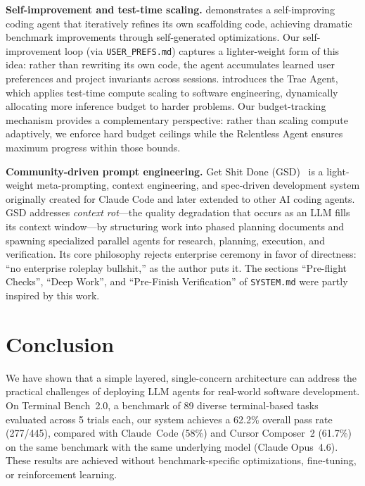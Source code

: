 \documentclass{article}
\begin{document}
\textbf{Self-improvement and test-time scaling.} \citet{robeyns2025selfimproving} demonstrates a self-improving coding agent that iteratively refines its own scaffolding code, achieving dramatic benchmark improvements through self-generated optimizations. Our self-improvement loop (via \texttt{USER\_PREFS.md}) captures a lighter-weight form of this idea: rather than rewriting its own code, the agent accumulates learned user preferences and project invariants across sessions.  \citet{gao2025trae} introduces the Trae Agent, which applies test-time compute scaling to software engineering, dynamically allocating more inference budget to harder problems.  Our budget-tracking mechanism provides a complementary perspective: rather than scaling compute adaptively, we enforce hard budget ceilings while the Relentless Agent ensures maximum progress within those bounds.

\textbf{Community-driven prompt engineering.} Get Shit Done (GSD)~\citep{gsd2025} is a light-weight meta-prompting, context engineering, and spec-driven development system originally created for Claude Code and later extended to other AI coding agents.  GSD addresses \emph{context rot}---the quality degradation that occurs as an LLM fills its context window---by structuring work into phased planning documents and spawning specialized parallel agents for research, planning, execution, and verification.  Its core philosophy rejects enterprise ceremony in favor of directness: ``no enterprise roleplay bullshit,'' as the author puts it.  The sections ``Pre-flight Checks'', ``Deep Work'', and ``Pre-Finish Verification'' of \texttt{SYSTEM.md} were partly inspired by this work.

\section{Conclusion}
\label{sec:conclusion}

We have shown that a simple layered, single-concern architecture can address the practical challenges of deploying LLM agents for real-world software development.  On Terminal Bench~2.0, a benchmark of 89 diverse terminal-based tasks evaluated across 5 trials each, our system achieves a 62.2\% overall pass rate (277/445), compared with Claude~Code (58\%) and Cursor Composer~2 (61.7\%) on the same benchmark with the same underlying model (Claude Opus~4.6).  These results are achieved without benchmark-specific optimizations, fine-tuning, or reinforcement learning.
\end{document}
